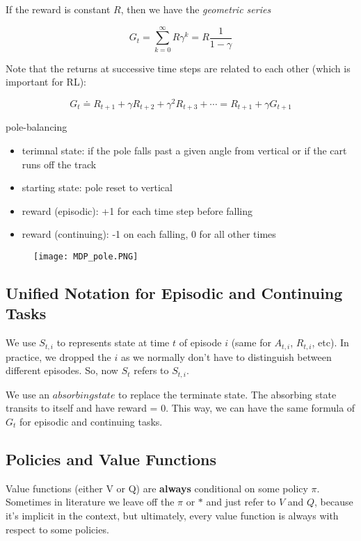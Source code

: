 \documentclass[lang=en,mode=geye,device=normal,color=blue,14pt]{elegantnote}
\DeclareMathOperator*{\1}{\mathbbm{1}}
\begin{document}
If the reward is constant $R$, then we have the \textit{geometric series}

$$ G_t = \sum_{k=0}^{\infty} R\gamma^k = R\frac{1}{1-\gamma} $$

Note that the returns at successive time steps are related to each other (which is important for RL):

$$ G_t \doteq R_{t+1} + \gamma R_{t+2} + \gamma^2 R_{t+3} + \cdots = R_{t+1} + \gamma G_{t+1} $$

\begin{example} pole-balancing
\begin{itemize}
\item terimnal state: if the pole falls past a given angle from vertical or if the cart runs off the track
\item starting state: pole reset to vertical
\item reward (episodic): +1 for each time step before falling
\item reward (continuing): -1 on each falling, 0 for all other times
\end{itemize}
\end{example}


\begin{figure}[!h]
  \texttt{[image: MDP\_pole.PNG]}
  \label{fig:MDP_pole}
\end{figure}



\subsection{Unified Notation for Episodic and Continuing Tasks}

We use $S_{t,i}$ to represents state at time $t$ of episode $i$ (same for $A_{t,i}$, $R_{t,i}$, etc).
In practice, we dropped the $i$ as we normally don't have to distinguish between different episodes.
So, now $S_t$ refers to $S_{t,i}$.

We use an $absorbing state$ to replace the terminate state. The absorbing state transits to itself and have reward = 0.
This way, we can have the same formula of $G_t$ for episodic and continuing tasks.

\subsection{Policies and Value Functions}

Value functions (either V or Q) are \textbf{always} conditional on some policy $\pi$. Sometimes in literature we leave off the $\pi$ or $*$ and just refer to $V$ and $Q$, because it’s implicit in the context, but ultimately, every value function is always with respect to some policies.
\end{document}
